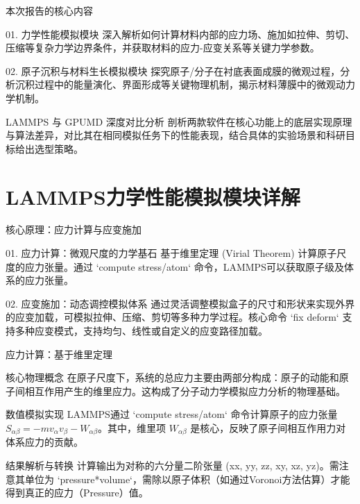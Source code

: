 \documentclass{beamer}
\begin{document}
\begin{frame}{本次报告的核心内容}
    \begin{block}{01. 力学性能模拟模块}
        深入解析如何计算材料内部的应力场、施加如拉伸、剪切、压缩等复杂力学边界条件，并获取材料的应力-应变关系等关键力学参数。
    \end{block}
    \begin{block}{02. 原子沉积与材料生长模拟模块}
        探究原子/分子在衬底表面成膜的微观过程，分析沉积过程中的能量演化、界面形成等关键物理机制，揭示材料薄膜中的微观动力学机制。
    \end{block}
    \begin{block}{LAMMPS 与 GPUMD 深度对比分析}
        剖析两款软件在核心功能上的底层实现原理与算法差异，对比其在相同模拟任务下的性能表现，结合具体的实验场景和科研目标给出选型策略。
    \end{block}
\end{frame}

\section{LAMMPS力学性能模拟模块详解}

\begin{frame}{核心原理：应力计算与应变施加}
    \begin{block}{01. 应力计算：微观尺度的力学基石}
        基于维里定理 (Virial Theorem) 计算原子尺度的应力张量。通过 `compute stress/atom` 命令，LAMMPS可以获取原子级及体系的应力张量。
    \end{block}
    \begin{block}{02. 应变施加：动态调控模拟体系}
        通过灵活调整模拟盒子的尺寸和形状来实现外界的应变加载，可模拟拉伸、压缩、剪切等多种力学过程。核心命令 `fix deform` 支持多种应变模式，支持均匀、线性或自定义的应变路径加载。
    \end{block}
\end{frame}

\begin{frame}{应力计算：基于维里定理}
    \begin{block}{核心物理概念}
        在原子尺度下，系统的总应力主要由两部分构成：原子的动能和原子间相互作用产生的维里应力。这构成了分子动力学模拟应力分析的物理基础。
    \end{block}
    \begin{block}{数值模拟实现}
        LAMMPS通过 `compute stress/atom` 命令计算原子的应力张量 $S_{\alpha\beta} = -mv_{\alpha}v_{\beta} - W_{\alpha\beta}$。其中，维里项 $W_{\alpha\beta}$ 是核心，反映了原子间相互作用力对体系应力的贡献。
    \end{block}
    \begin{block}{结果解析与转换}
        计算输出为对称的六分量二阶张量 (xx, yy, zz, xy, xz, yz)。需注意其单位为 `pressure*volume`，需除以原子体积（如通过Voronoi方法估算）才能得到真正的应力（Pressure）值。
    \end{block}
\end{frame}
\end{document}
